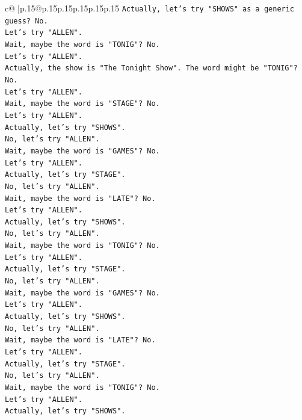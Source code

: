 \documentclass{article}
\begin{document}
{\begin{supertabular}{c@{$\;$}|p{.15\linewidth}@{}p{.15\linewidth}p{.15\linewidth}p{.15\linewidth}p{.15\linewidth}p{.15\linewidth}}
{{{\texttt{Actually, let's try "SHOWS" as a generic guess? No.} \\
\texttt{Let's try "ALLEN".} \\
\texttt{Wait, maybe the word is "TONIG"? No.} \\
\texttt{Let's try "ALLEN".} \\
\texttt{Actually, the show is "The Tonight Show". The word might be "TONIG"? No.} \\
\texttt{Let's try "ALLEN".} \\
\texttt{Wait, maybe the word is "STAGE"? No.} \\
\texttt{Let's try "ALLEN".} \\
\texttt{Actually, let's try "SHOWS".} \\
\texttt{No, let's try "ALLEN".} \\
\texttt{Wait, maybe the word is "GAMES"? No.} \\
\texttt{Let's try "ALLEN".} \\
\texttt{Actually, let's try "STAGE".} \\
\texttt{No, let's try "ALLEN".} \\
\texttt{Wait, maybe the word is "LATE"? No.} \\
\texttt{Let's try "ALLEN".} \\
\texttt{Actually, let's try "SHOWS".} \\
\texttt{No, let's try "ALLEN".} \\
\texttt{Wait, maybe the word is "TONIG"? No.} \\
\texttt{Let's try "ALLEN".} \\
\texttt{Actually, let's try "STAGE".} \\
\texttt{No, let's try "ALLEN".} \\
\texttt{Wait, maybe the word is "GAMES"? No.} \\
\texttt{Let's try "ALLEN".} \\
\texttt{Actually, let's try "SHOWS".} \\
\texttt{No, let's try "ALLEN".} \\
\texttt{Wait, maybe the word is "LATE"? No.} \\
\texttt{Let's try "ALLEN".} \\
\texttt{Actually, let's try "STAGE".} \\
\texttt{No, let's try "ALLEN".} \\
\texttt{Wait, maybe the word is "TONIG"? No.} \\
\texttt{Let's try "ALLEN".} \\
\texttt{Actually, let's try "SHOWS".} \\
}}}
\end{supertabular}}
\end{document}

